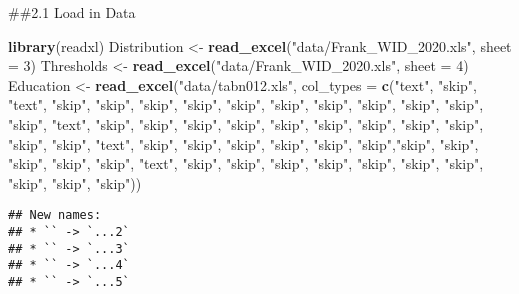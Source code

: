 \documentclass[
]{article}
\newenvironment{Shaded}{\begin{snugshade}}{\end{snugshade}}
\newcommand{\AttributeTok}[1]{\textcolor[rgb]{0.13,0.29,0.53}{#1}}
\newcommand{\DecValTok}[1]{\textcolor[rgb]{0.00,0.00,0.81}{#1}}
\newcommand{\FunctionTok}[1]{\textcolor[rgb]{0.13,0.29,0.53}{\textbf{#1}}}
\newcommand{\NormalTok}[1]{#1}
\newcommand{\OtherTok}[1]{\textcolor[rgb]{0.56,0.35,0.01}{#1}}
\newcommand{\StringTok}[1]{\textcolor[rgb]{0.31,0.60,0.02}{#1}}
\begin{document}
\#\#2.1 Load in Data

\begin{Shaded}
\begin{Highlighting}[]
\FunctionTok{library}\NormalTok{(readxl)}
\NormalTok{Distribution }\OtherTok{\textless{}{-}} \FunctionTok{read\_excel}\NormalTok{(}\StringTok{"data/Frank\_WID\_2020.xls"}\NormalTok{, }\AttributeTok{sheet =} \DecValTok{3}\NormalTok{)}
\NormalTok{Thresholds }\OtherTok{\textless{}{-}} \FunctionTok{read\_excel}\NormalTok{(}\StringTok{"data/Frank\_WID\_2020.xls"}\NormalTok{, }\AttributeTok{sheet =} \DecValTok{4}\NormalTok{)}
\NormalTok{Education }\OtherTok{\textless{}{-}} \FunctionTok{read\_excel}\NormalTok{(}\StringTok{"data/tabn012.xls"}\NormalTok{, }\AttributeTok{col\_types =} \FunctionTok{c}\NormalTok{(}\StringTok{"text"}\NormalTok{, }\StringTok{"skip"}\NormalTok{, }\StringTok{"text"}\NormalTok{, }\StringTok{"skip"}\NormalTok{, }\StringTok{"skip"}\NormalTok{, }\StringTok{"skip"}\NormalTok{, }\StringTok{"skip"}\NormalTok{, }\StringTok{"skip"}\NormalTok{, }\StringTok{"skip"}\NormalTok{, }\StringTok{"skip"}\NormalTok{, }\StringTok{"skip"}\NormalTok{, }\StringTok{"skip"}\NormalTok{, }\StringTok{"skip"}\NormalTok{, }\StringTok{"skip"}\NormalTok{, }\StringTok{"text"}\NormalTok{, }\StringTok{"skip"}\NormalTok{, }\StringTok{"skip"}\NormalTok{, }\StringTok{"skip"}\NormalTok{, }\StringTok{"skip"}\NormalTok{, }\StringTok{"skip"}\NormalTok{, }\StringTok{"skip"}\NormalTok{, }\StringTok{"skip"}\NormalTok{, }\StringTok{"skip"}\NormalTok{, }\StringTok{"skip"}\NormalTok{, }\StringTok{"skip"}\NormalTok{, }\StringTok{"skip"}\NormalTok{, }\StringTok{"text"}\NormalTok{, }\StringTok{"skip"}\NormalTok{, }\StringTok{"skip"}\NormalTok{, }\StringTok{"skip"}\NormalTok{, }\StringTok{"skip"}\NormalTok{, }\StringTok{"skip"}\NormalTok{, }\StringTok{"skip"}\NormalTok{,}\StringTok{"skip"}\NormalTok{, }\StringTok{"skip"}\NormalTok{, }\StringTok{"skip"}\NormalTok{, }\StringTok{"skip"}\NormalTok{, }\StringTok{"skip"}\NormalTok{, }\StringTok{"text"}\NormalTok{, }\StringTok{"skip"}\NormalTok{, }\StringTok{"skip"}\NormalTok{, }\StringTok{"skip"}\NormalTok{, }\StringTok{"skip"}\NormalTok{, }\StringTok{"skip"}\NormalTok{, }\StringTok{"skip"}\NormalTok{, }\StringTok{"skip"}\NormalTok{, }\StringTok{"skip"}\NormalTok{, }\StringTok{"skip"}\NormalTok{, }\StringTok{"skip"}\NormalTok{))}
\end{Highlighting}
\end{Shaded}

\begin{verbatim}
## New names:
## * `` -> `...2`
## * `` -> `...3`
## * `` -> `...4`
## * `` -> `...5`
\end{verbatim}
\end{document}

